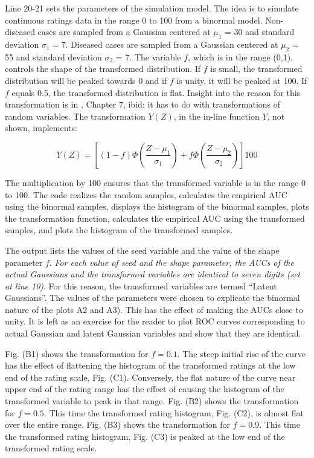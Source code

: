 \documentclass[
]{book}
\begin{document}
Line 20-21 sets the parameters of the simulation model. The idea is to simulate continuous ratings data in the range 0 to 100 from a binormal model. Non-diseased cases are sampled from a Gaussian centered at \(\mu_1\) = 30 and standard deviation \(\sigma_1 = 7\). Diseased cases are sampled from a Gaussian centered at \(\mu_2\) = 55 and standard deviation \(\sigma_2\) = 7. The variable \(f\), which is in the range (0,1), controls the shape of the transformed distribution. If \(f\) is small, the transformed distribution will be peaked towards 0 and if \(f\) is unity, it will be peaked at 100. If \(f\) equals 0.5, the transformed distribution is flat. Insight into the reason for this transformation is in \citep{RN300}, Chapter 7, ibid: it has to do with transformations of random variables. The transformation \(Y(Z)\), in the in-line function \(Y\), not shown, implements:

\begin{equation} 
Y\left ( Z \right )=\left [ \left ( 1-f \right )\Phi\left ( \frac{Z-\mu_1}{\sigma_1} \right )+f\Phi\left ( \frac{Z-\mu_2}{\sigma_2} \right ) \right ]100
\label{eq:BinModDemoMisconception}
\end{equation}

The multiplication by 100 ensures that the transformed variable is in the range 0 to 100. The code realizes the random samples, calculates the empirical AUC using the binormal samples, displays the histogram of the binormal samples, plots the transformation function, calculates the empirical AUC using the transformed samples, and plots the histogram of the transformed samples.

The output lists the values of the seed variable and the value of the shape parameter \(f\). \emph{For each value of seed and the shape parameter, the AUCs of the actual Gaussians and the transformed variables are identical to seven digits (set at line 10)}. For this reason, the transformed variables are termed ``Latent Gaussians''. The values of the parameters were chosen to explicate the binormal nature of the plots A2 and A3). This has the effect of making the AUCs close to unity. It is left as an exercise for the reader to plot ROC curves corresponding to actual Gaussian and latent Gaussian variables and show that they are identical.

Fig. (B1) shows the transformation for \(f = 0.1\). The steep initial rise of the curve has the effect of flattening the histogram of the transformed ratings at the low end of the rating scale, Fig. (C1). Conversely, the flat nature of the curve near upper end of the rating range has the effect of causing the histogram of the transformed variable to peak in that range. Fig. (B2) shows the transformation for \(f = 0.5\). This time the transformed rating histogram, Fig. (C2), is almost flat over the entire range. Fig. (B3) shows the transformation for \(f = 0.9\). This time the transformed rating histogram, Fig. (C3) is peaked at the low end of the transformed rating scale.
\end{document}
